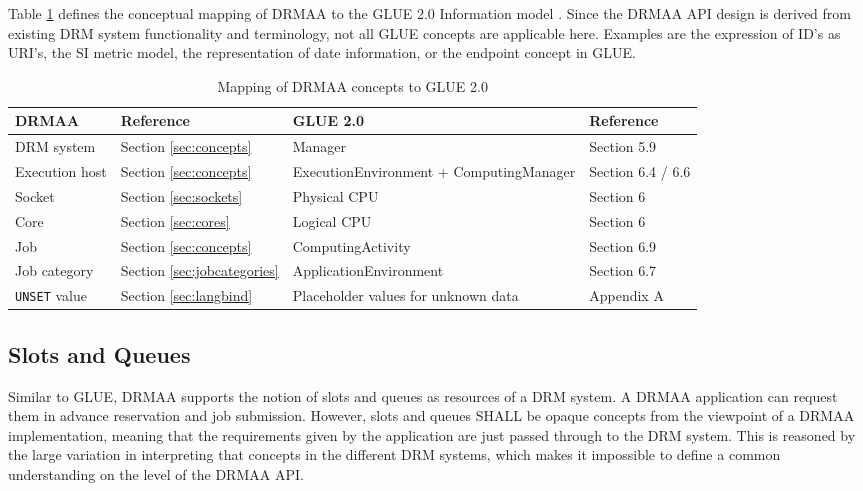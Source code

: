 \documentclass{article}
\newcommand{\h}[1]{\lstinline|#1|}
\begin{document}
Table \ref{tab:gluemapping} defines the conceptual mapping of DRMAA to the GLUE 2.0 Information model \cite{gfd.147}. Since the DRMAA API design is derived from existing DRM system functionality and terminology, not all GLUE concepts are applicable here. Examples are the expression of ID's as URI's, the SI metric model, the representation of date information, or the endpoint concept in GLUE.

\begin{table}[ht]
\centering
\begin{tabularx}{\textwidth}{|X|X|l|X|}
\hline
DRMAA & Reference & GLUE 2.0  & Reference \cite{gfd.147} \\
\hline
DRM system & Section \ref{sec:concepts} & Manager & Section 5.9 \\
Execution host & Section \ref{sec:concepts} & ExecutionEnvironment + ComputingManager & Section 6.4 / 6.6 \\
Socket & Section \ref{sec:sockets} & Physical CPU & Section 6 \\
Core & Section \ref{sec:cores} & Logical CPU & Section 6 \\
Job & Section \ref{sec:concepts} & ComputingActivity & Section 6.9 \\
Job category & Section \ref{sec:jobcategories} & ApplicationEnvironment & Section 6.7 \\
\h{UNSET} value	& Section \ref{sec:langbind} & Placeholder values for unknown data & Appendix A \\
\hline
\end{tabularx}
\caption{Mapping of DRMAA concepts to GLUE 2.0}
\label{tab:gluemapping}
\end{table}

\subsection{Slots and Queues}
\label{sec:slotsandqueues}

Similar to GLUE, DRMAA supports the notion of slots and queues as resources of a DRM system. A DRMAA application can request them in advance reservation and job submission. However, slots and queues SHALL be opaque concepts from the viewpoint of a DRMAA implementation, meaning that the requirements given by the application are just passed through to the DRM system. This is reasoned by the large variation in interpreting that concepts in the different DRM systems, which makes it impossible to define a common understanding on the level of the DRMAA API.
\end{document}
